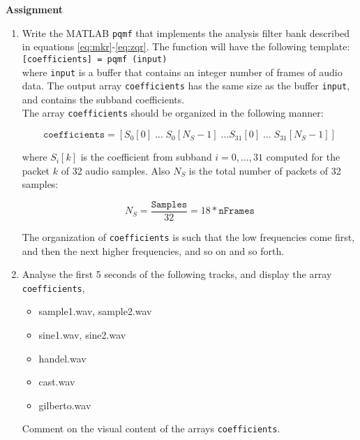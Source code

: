\documentclass{article} %
\begin{document}
\begin{framed}
\textbf{Assignment}
\begin{enumerate}
\item Write the MATLAB \verb|pqmf| that implements the analysis filter bank
described in equations \ref{eq:mkr}-\ref{eq:zqr}. The function will have the
following template:
\\[2ex]
\verb|[coefficients] = pqmf (input)|
\\[2ex]
where \verb|input| is a buffer that contains an integer number of frames
of audio data. The output array \verb|coefficients| has the same
size as the buffer \verb|input|, and contains the subband coefficients. 
\\

The array \verb|coefficients| should be organized in the following manner:

\begin{equation}
\texttt{coefficients} = 
\left[ S_{0}[0] \; \dots \; S_{0}[N_S-1] \; 
\dots S_{31}[0] \; \dots \; S_{31}[N_S-1]\right]
\end{equation}

where $S_i[k]$ is the coefficient from subband $i=0,\dots,31$ computed
for the packet $k$ of 32 audio samples. Also $N_S$ is the total number of
packets of 32 samples:

\begin{equation}
N_S=\frac{\texttt{Samples}}{32}=18*\texttt{nFrames}
\end{equation}

The organization of \verb|coefficients| is such that the low frequencies
come first, and then the next higher frequencies, and so on and so forth. 

\item Analyse the first 5 seconds of the following tracks, and display the
array \verb|coefficients|,

\begin{itemize}
\item sample1.wav, sample2.wav
\item sine1.wav, sine2.wav
\item handel.wav
\item cast.wav
\item gilberto.wav
\end{itemize}

Comment on the visual content of the arrays \verb|coefficients|.
\end{enumerate}
\end{framed}
\end{document}
